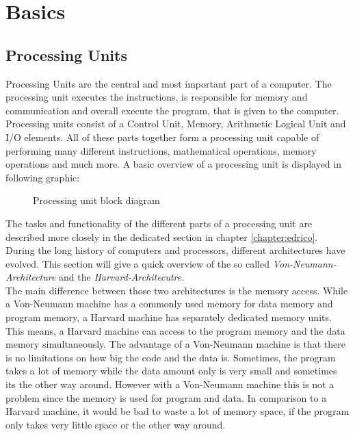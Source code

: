 
\chapter{Basics}
\section{Processing Units}
Processing Units are the central and most important part of a computer. The processing unit executes the instructions, is responsible for memory and communication and overall execute the program, that is given to the computer. Processing units consist of a Control Unit, Memory, Arithmetic Logical Unit and I/O elements. All of these parts together form a processing unit capable of performing many different instructions, mathematical operations, memory operations and much more. A basic overview of a processing unit is displayed in following graphic:\\
\begin{center}
	\begin{figure}[H]
		\centering
\caption{Processing unit block diagram}
\end{figure}
\end{center}
\clearpage
The tasks and functionality of the different parts of a processing unit are described more closely in the dedicated section in chapter \ref{chapter:edrico}.\\
During the long history of computers and processors, different architectures have evolved. This section will give a quick overview of the so called \textit{Von-Neumann-Architecture} and the \textit{Harvard-Architecutre}.\\
The main difference between those two architectures is the memory access. While a Von-Neumann machine has a commonly used memory for data memory and program memory, a Harvard machine has separately dedicated memory units. This means, a Harvard machine can access to the program memory and the data memory simultaneously. The advantage of a Von-Neumann machine is that there is no limitations on how big the code and the data is. Sometimes, the program takes a lot of memory while the data amount only is very small and sometimes its the other way around. However with a Von-Neumann machine this is not a problem since the memory is used for program and data. In comparison to a Harvard machine, it would be bad to waste a lot of memory space, if the program only takes very little space or the other way around.\\
